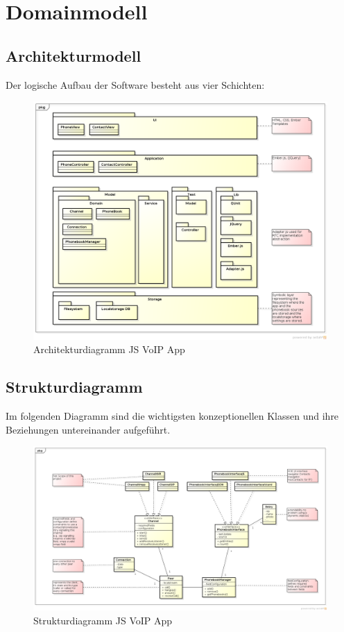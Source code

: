 \chapter{Domainmodell}

\section{Architekturmodell}
Der logische Aufbau der Software besteht aus vier Schichten:
\begin{figure}[h]
	\centering
	\includegraphics[width=1\textwidth]{img/architecture.png}
	\caption{Architekturdiagramm JS VoIP App}
\end{figure}

\begin{landscape}
\section{Strukturdiagramm}
Im folgenden Diagramm sind die wichtigsten konzeptionellen Klassen und ihre Beziehungen untereinander aufgeführt.
\begin{figure}[h]
	\centering
	\includegraphics[width=1.2\textwidth]{img/domain.png}
	\caption{Strukturdiagramm JS VoIP App}
\end{figure}
\end{landscape}
\clearpage

